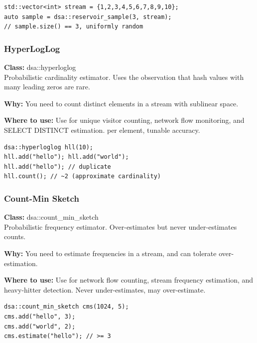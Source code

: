 \documentclass[11pt]{article}
\begin{document}
\begin{lstlisting}
std::vector<int> stream = {1,2,3,4,5,6,7,8,9,10};
auto sample = dsa::reservoir_sample(3, stream);
// sample.size() == 3, uniformly random
\end{lstlisting}

\subsubsection{HyperLogLog}
\textbf{Class:} dsa::hyperloglog\\

Probabilistic cardinality estimator. Uses the observation that hash values with many leading zeros are rare.

\textbf{Why:} You need to count distinct elements in a stream with sublinear space. \par \textbf{Where to use:} Use for unique visitor counting, network flow monitoring, and SELECT DISTINCT estimation. per element, tunable accuracy.

\begin{lstlisting}
dsa::hyperloglog hll(10);
hll.add("hello"); hll.add("world");
hll.add("hello"); // duplicate
hll.count(); // ~2 (approximate cardinality)
\end{lstlisting}

\subsubsection{Count-Min Sketch}
\textbf{Class:} dsa::count\_min\_sketch\\

Probabilistic frequency estimator. Over-estimates but never under-estimates counts.

\textbf{Why:} You need to estimate frequencies in a stream, and can tolerate over-estimation. \par \textbf{Where to use:} Use for network flow counting, stream frequency estimation, and heavy-hitter detection. Never under-estimates, may over-estimate.

\begin{lstlisting}
dsa::count_min_sketch cms(1024, 5);
cms.add("hello", 3);
cms.add("world", 2);
cms.estimate("hello"); // >= 3
\end{lstlisting}

\end{document}
